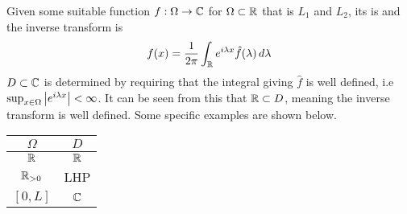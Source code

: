 \documentclass{article}
\begin{document}
\begin{definition}
Given some suitable function $f:\Omega \to \mathbb{C}$ for $\Omega \subset \mathbb{R}$ that is $L_1$ and $L_2$, its  is 
and the inverse transform is 
\[
f(x) = \frac{1}{2\pi} \int_{\mathbb{R}} e^{i\lambda x} \hat{f}(\lambda) \, d\lambda
\]
$D\subset \mathbb{C}$ is determined by requiring that the integral giving $\hat{f}$ is well defined, i.e $\sup_{x \in \Omega } \left\lvert e^{i\lambda x} \right\rvert < \infty$. It can be seen from this that $\mathbb{R} \subset D$, meaning the inverse transform is well defined. Some specific examples are shown below.
\begin{table}[ht]
\centering 
\begin{tabular}{c|c} 
$\Omega$ & $D$ \\ [0.5ex] 
\hline\hline 
$\mathbb{R}$ &  $\mathbb{R}$ \\
\hline %
$\mathbb{R}_{>0}$ & LHP \\
\hline
$[0,L]$ & $\mathbb{C}$ \\ [1ex] %
\end{tabular}
\end{table}

\end{definition}

\begin{lemma}
\end{lemma}

\end{document}
